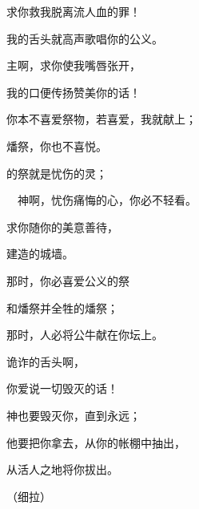 {\par }{\Q 求你救我脱离流人血的罪！
\par }{\Q 我的舌头就高声歌唱你的公义。
\par }{\BB \par }{\Q {}主啊，求你使我嘴唇张开，
\par }{\Q 我的口便传扬赞美你的话！
\par }{\Q {}你本不喜爱祭物，若喜爱，我就献上；
\par }{\Q 燔祭，你也不喜悦。
\par }{\Q {}的祭就是忧伤的灵；
\par }{\Q 　神啊，忧伤痛悔的心，你必不轻看。
\par }{\BB \par }{\Q {}求你随你的美意善待{}，
\par }{\Q 建造{}的城墙。
\par }{\Q {}那时，你必喜爱公义的祭
\par }{\Q 和燔祭并全牲的燔祭；
\par }{\Q 那时，人必将公牛献在你坛上。

\par }
{\Q {}诡诈的舌头啊，
\par }{\Q 你爱说一切毁灭的话！
\par }{\BB \par }{\Q {}神也要毁灭你，直到永远；
\par }{\Q 他要把你拿去，从你的帐棚中抽出，
\par }{\Q 从活人之地将你拔出。
\par }{\QS （细拉）
\par }
